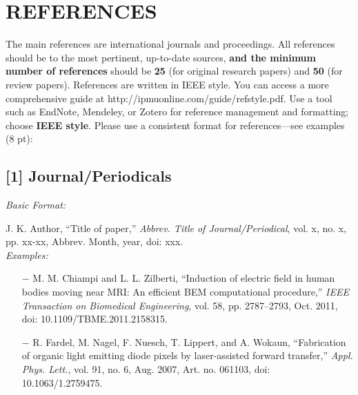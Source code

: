 \documentclass{iaesarticle}
\begin{document}
\section*{REFERENCES}
\label{}
\footnotesize
The main references are international journals and proceedings. All references should be to the most pertinent, up-to-date sources, \textbf{and the minimum number of references} should be \textbf{25} (for original research papers) and \textbf{50} (for review papers). References are written in IEEE style. You can access a more comprehensive guide at http://ipmuonline.com/guide/refstyle.pdf. Use a tool such as EndNote, Mendeley, or Zotero for reference management and formatting; choose \textbf{IEEE style}. Please use a consistent format for references—see examples (8 pt):

\subsection*{[1] Journal/Periodicals}
\footnotesize
\begin{flushleft}
\textsl{Basic Format:\\}
\end{flushleft}
\vspace{-1.1em} 
J. K. Author, “Title of paper,” \textsl{Abbrev. Title of Journal/Periodical}, vol. x, no. x, pp. xx-xx, Abbrev. Month, year, doi: xxx.\\ 
\emph{Examples:}
\begin{enumerate} [leftmargin=*, topsep=0.3ex, itemsep=0.3ex, parsep=0.2ex]
\footnotesize
\item[$-$] M. M. Chiampi and L. L. Zilberti, “Induction of electric field in human bodies moving near MRI: An efficient BEM computational procedure,” \textsl{IEEE Transaction on Biomedical Engineering}, vol. 58, pp. 2787–2793, Oct. 2011, doi: 10.1109/TBME.2011.2158315.
\item[$-$] R. Fardel, M. Nagel, F. Nuesch, T. Lippert, and A. Wokaun, “Fabrication of organic light emitting diode pixels by laser-assisted forward transfer,” \textsl{Appl. Phys. Lett.}, vol. 91, no. 6, Aug. 2007, Art. no. 061103, doi: 10.1063/1.2759475.
\end{enumerate}
\end{document}
